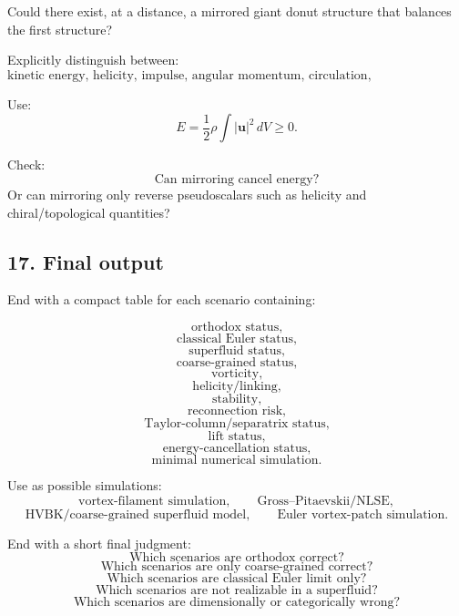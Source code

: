 \documentclass[11pt]{article}
\begin{document}
            Could there exist, at a distance, a mirrored giant donut structure that balances the first structure?
            
            Explicitly distinguish between:
            \[
                \text{kinetic energy, helicity, impulse, angular momentum, circulation, chiral/topological charge.}
            \]
            
            Use:
            \[
                E
                =
                \frac{1}{2}\rho\int |\mathbf{u}|^2\,dV
                \geq0.
            \]
            
            Check:
            \[
                \text{Can mirroring cancel energy?}
            \]
            Or can mirroring only reverse pseudoscalars such as helicity and chiral/topological quantities?
        
        \subsection{17. Final output}
            
            End with a compact table for each scenario containing:
            
            \[
                \text{orthodox status,}
            \]
            \[
                \text{classical Euler status,}
            \]
            \[
                \text{superfluid status,}
            \]
            \[
                \text{coarse-grained status,}
            \]
            \[
                \text{vorticity,}
            \]
            \[
                \text{helicity/linking,}
            \]
            \[
                \text{stability,}
            \]
            \[
                \text{reconnection risk,}
            \]
            \[
                \text{Taylor-column/separatrix status,}
            \]
            \[
                \text{lift status,}
            \]
            \[
                \text{energy-cancellation status,}
            \]
            \[
                \text{minimal numerical simulation.}
            \]
            
            Use as possible simulations:
            \[
                \text{vortex-filament simulation},
                \qquad
                \text{Gross--Pitaevskii/NLSE},
            \]
            \[
                \text{HVBK/coarse-grained superfluid model},
                \qquad
                \text{Euler vortex-patch simulation}.
            \]
            
            End with a short final judgment:
            \[
                \text{Which scenarios are orthodox correct?}
            \]
            \[
                \text{Which scenarios are only coarse-grained correct?}
            \]
            \[
                \text{Which scenarios are classical Euler limit only?}
            \]
            \[
                \text{Which scenarios are not realizable in a superfluid?}
            \]
            \[
                \text{Which scenarios are dimensionally or categorically wrong?}
            \]
\end{document}
